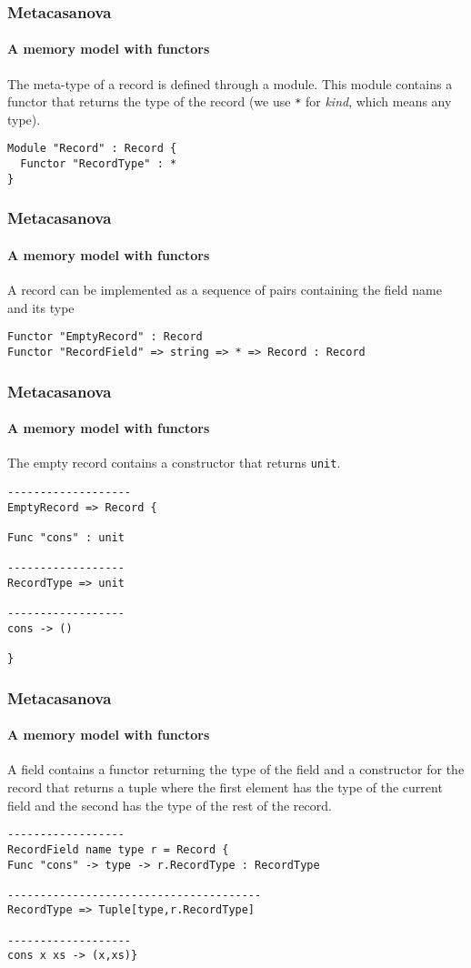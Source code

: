 \documentclass[10pt,a4paper]{beamer}
\begin{document}
\begin{frame}[fragile]
\frametitle{Metacasanova}
\framesubtitle{A memory model with functors}

The meta-type of a record is defined through a module. This module contains a functor that returns the type of the record (we use \texttt{*} for \textit{kind}, which means any type).

\begin{lstlisting}
Module "Record" : Record {
  Functor "RecordType" : *
}
\end{lstlisting}
\end{frame}

\begin{frame}[fragile]
\frametitle{Metacasanova}
\framesubtitle{A memory model with functors}

A record can be implemented as a sequence of pairs containing the field name and its type

\begin{lstlisting}
Functor "EmptyRecord" : Record
Functor "RecordField" => string => * => Record : Record
\end{lstlisting}
\end{frame}

\begin{frame}[fragile]
\frametitle{Metacasanova}
\framesubtitle{A memory model with functors}

The empty record contains a constructor that returns \texttt{unit}.

\begin{lstlisting}
-------------------
EmptyRecord => Record {

Func "cons" : unit

------------------
RecordType => unit

------------------
cons -> ()

}
\end{lstlisting}

\end{frame}

\begin{frame}[fragile]
\frametitle{Metacasanova}
\framesubtitle{A memory model with functors}

A field contains a functor returning the type of the field and a constructor for the record that returns a tuple where the first element has the type of the current field and the second has the type of the rest of the record.

\begin{lstlisting}
------------------
RecordField name type r = Record {
Func "cons" -> type -> r.RecordType : RecordType

---------------------------------------
RecordType => Tuple[type,r.RecordType]

-------------------
cons x xs -> (x,xs)} 
\end{lstlisting}
\end{frame}
\end{document}
